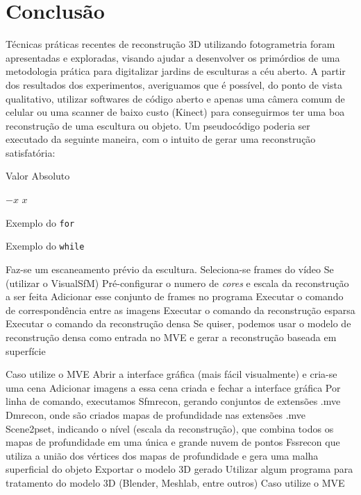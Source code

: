 \chapter{Conclusão}
Técnicas práticas recentes de reconstrução 3D utilizando fotogrametria foram
apresentadas e exploradas, visando ajudar a desenvolver os primórdios de uma metodologia prática para digitalizar jardins de esculturas a céu
aberto. A partir dos resultados dos experimentos, averiguamos que é possível, do ponto de vista qualitativo, utilizar softwares de código aberto e apenas uma câmera comum de celular ou uma scanner de baixo custo (Kinect) para conseguirmos ter uma boa reconstrução de uma escultura ou objeto. Um pseudocódigo poderia ser executado da seguinte maneira, com o intuito de gerar uma reconstrução satisfatória:


\begin{algorithm}
\caption{Valor Absoluto}
\begin{algorithmic}[1]
    \State \Return $-x$
  \Else
    \State \Return $x$
  \EndIf
\EndFunction
\end{algorithmic}
\end{algorithm}

\begin{algorithm}
\caption{Exemplo do \texttt{for}} 
\begin{algorithmic}[1]
    
\EndFor
\end{algorithmic}
\end{algorithm}

\begin{algorithm}
\caption{Exemplo do \texttt{while}}
\end{algorithm}
Faz-se um escaneamento prévio da escultura.
Seleciona-se frames do vídeo
Se (utilizar o VisualSfM) {
  Pré-configurar o numero de \emph{cores} e escala da reconstrução a ser feita
  Adicionar esse conjunto de frames no programa
  Executar o comando de correspondência entre as imagens
  Executar o comando da reconstrução esparsa
  Executar o comando da reconstrução densa
    Se quiser, podemos usar o modelo de reconstrução densa como entrada no MVE e gerar a reconstrução baseada em superfície
  }

Caso utilize o MVE {
  Abrir a interface gráfica (mais fácil visualmente) e cria-se uma cena
  Adicionar imagens a essa cena criada e fechar a interface gráfica
  Por linha de comando, executamos {
    Sfmrecon, gerando conjuntos de extensões .mve
    Dmrecon, onde são criados mapas de profundidade nas extensões .mve
    Scene2pset, indicando o nível (escala da reconstrução), que combina todos os mapas de profundidade em uma única e grande nuvem de pontos
    Fssrecon que utiliza a união dos vértices dos mapas de profundidade e gera uma malha superficial do objeto
  }
Exportar o modelo 3D gerado
Utilizar algum programa para tratamento do modelo 3D (Blender, Meshlab, entre outros)
}
Caso utilize o MVE


